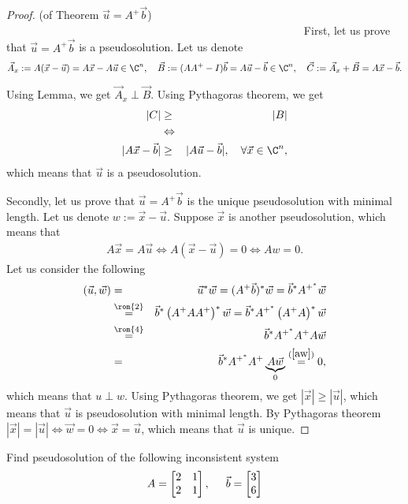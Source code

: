     \begin{proof}(of Theorem $\vec{u} = A^+\vec{b}$)~ ~ ~ ~ ~ ~ ~~ ~ ~ ~ ~ ~ ~~ ~ ~ ~ ~ ~ ~~ ~ ~ ~ ~ ~ ~~ ~ ~ ~ ~ ~ ~~ ~ ~ ~ ~ ~ ~~ ~ ~ ~ ~ ~ ~~ ~ ~ ~ ~ ~ ~~ ~ ~ ~ ~ ~ ~
        First, let us prove that $\vec{u} = A^+\vec{b}$ is a pseudosolution. Let us denote
        $$
            \vec{A}_x:= A(\vec{x}-\vec{u})=A\vec{x}-A\vec{u}\in \C^n,\quad
            \vec{B}  := (AA^+-I)\vec{b}  = A\vec{u}-\vec{b}\in \C^n,\quad
            \vec{C}  := \vec{A}_x+\vec{B} =A\vec{x}-\vec{b}.
        $$
        
         Using Lemma, we get $\vec{A}_x\perp\vec{B}$. Using Pythagoras theorem, we get
         \begin{eqnarray}
            |C|&\ge&|B|\nonumber\\
            &\Leftrightarrow&\nonumber\\ 
            |A\vec{x}-\vec{b}|&\ge&|A\vec{u}-\vec{b}|,\quad \forall \vec{x}\in \C^n,\nonumber
         \end{eqnarray}
         which means that $\vec{u}$ is a pseudosolution.
    
        Secondly, let us prove that $\vec{u} = A^+\vec{b}$ is the unique pseudosolution with minimal length.  Let us denote $w:=\vec{x}-\vec{u}$. Suppose $\vec{x}$ is another pseudosolution, which means that 
        \begin{eqnarray}   
            A\vec{x}=A\vec{u}
            \Leftrightarrow A(\vec{x}-\vec{u})=0
            \Leftrightarrow Aw=0.\label{aw}
        \end{eqnarray}
        Let us consider the following
        \begin{eqnarray}
          \left(\vec{u}, \vec{w}\right) 
          &=& \vec{u}^* \vec{w} 
          = (A^+\vec{b})^* \vec{w} 
          = \vec{b}^*A^{+^*} \vec{w}\nonumber\\
          &\overset{\rom{2}}{=}& \vec{b}^*\left(A^+AA^+\right)^*\vec{w}  
          = \vec{b}^*A^{+^*}\left(A^+A\right)^*\vec{w}  \nonumber\\
          &\overset{\rom{4}}{=}& \vec{b}^*A^{+^*}A^+A\vec{w}\nonumber\\
          &=&\vec{b}^*A^{+^*}A^+\underbrace{A\vec{w}}_{0} \overset{(\ref{aw})}{=} 0,\nonumber
        \end{eqnarray}
        which means that $u\perp w$. Using Pythagoras theorem, we get $|\vec{x}|\ge|\vec{u}|$, which means that $\vec{u}$ is pseudosolution with minimal length. By Pythagoras theorem $|\vec{x}|=|\vec{u}|\Leftrightarrow\vec{w}=0\Leftrightarrow \vec{x}=\vec{u}$, which means that $\vec{u}$ is unique.
    \end{proof}
    \Ex
    Find pseudosolution of the following inconsistent system
    \[
        A = \begin{bmatrix}
            2 & 1\\
            2 & 1
        \end{bmatrix}, \hspace*{0.5cm} \vec{b} = \begin{bmatrix}
            3 \\ 6
        \end{bmatrix}  
    \]
    
